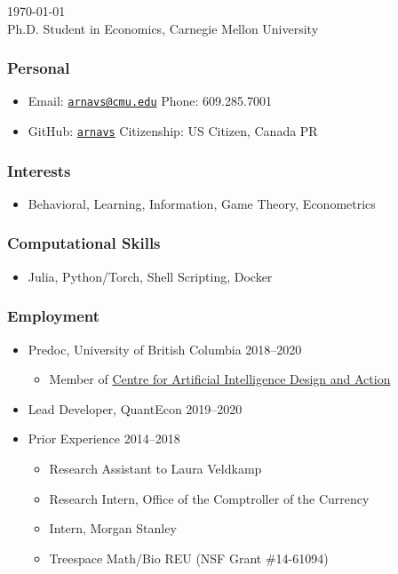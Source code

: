 \documentclass[12pt]{article}   %
\begin{document}
\renewcommand{\labelitemi}{~}

 \hfill \monthyeardate\today \\
\flushleft Ph.D. Student in Economics, Carnegie Mellon University

\subsubsection*{Personal}
\begin{itemize}
  \item Email: \href{mailto:arnavs@cmu.edu}{\texttt{arnavs@cmu.edu}} \hfill Phone: 609.285.7001
  \item GitHub: \href{https://github.com/arnavs}{\texttt{arnavs}} \hfill Citizenship: US Citizen, Canada PR
\end{itemize}

\subsubsection*{Interests}
\begin{itemize}
  \item Behavioral, Learning, Information, Game Theory, Econometrics
\end{itemize} 

\subsubsection*{Computational Skills}
\begin{itemize}
  \item Julia, Python/Torch, Shell Scripting, Docker
\end{itemize} 

\subsubsection*{Employment}
\begin{itemize}
  \item Predoc, University of British Columbia \hfill 2018--2020
  \begin{itemize} \small
    \item Member of \href{https://caida.ubc.ca/caida-ubc-icics-centre-artificial-intelligence-decision-making-and-action}{Centre for Artificial Intelligence Design and Action}
  \end{itemize}
  \item Lead Developer, QuantEcon \hfill 2019--2020
  \item Prior Experience \hfill 2014--2018 
  \begin{itemize}\setlength{\leftskip}{1cm}
    \item Research Assistant to Laura Veldkamp
    \item Research Intern, Office of the Comptroller of the Currency
    \item Intern, Morgan Stanley 
    \item Treespace Math/Bio REU (NSF Grant \#14-61094)
  \end{itemize}
\end{itemize}
\end{document}

